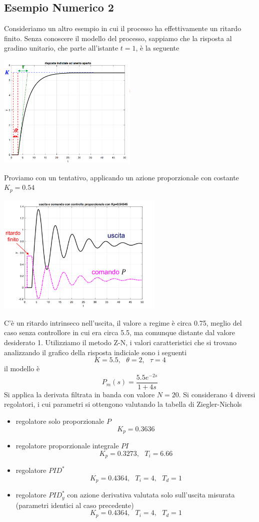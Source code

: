 \documentclass[10pt, letterpaper]{report}
\begin{document}
\subsection{Esempio Numerico 2}
Consideriamo un altro esempio in cui il processo ha effettivamente un ritardo finito. Senza conoscere il modello del processo, sappiamo che la risposta al gradino unitario, che parte all'istante $t=1$, è la seguente 
\begin{center}
    \includegraphics[width=0.5\textwidth]{images/ZN8.png}
\end{center}
Proviamo con un tentativo, applicando un azione proporzionale con costante $K_p=0.54$
\begin{center}
    \includegraphics[width=0.6\textwidth]{images/ZN9.png}
\end{center}
C'è un ritardo intrinseco nell'uscita, il valore a regime è circa 0.75, meglio del caso senza controllore in cui era circa 5.5, ma comunque distante dal valore desiderato 1. Utilizziamo il metodo Z-N, i valori caratteristici che si trovano analizzando il grafico della risposta indiciale sono i seguenti
$$ K=5.5, \ \  \
\theta = 2, \ \  \
\tau = 4 $$
il modello è 
$$ P_m(s)=\frac{5.5e^{-2s}}{1+4s}$$
Si applica la derivata filtrata in banda con valore $N=20$.
Si considerano 4 diversi regolatori, i cui parametri si ottengono valutando la tabella di Ziegler-Nichols
\begin{itemize}
    \item regolatore solo proporzionale $P$ $$ K_p=0.3636$$
    \item regolatore proporzionale integrale $PI$ $$  K_p=0.3273, \ \ \ T_i=6.66$$
    \item regolatore $PID^*$ $$ K_p=0.4364, \ \ \
    T_i=4 , \ \ \
    T_d=1 $$ 
    \item regolatore $PID^*_y$ con azione derivativa valutata solo sull'uscita misurata (parametri identici al caso precedente)$$ K_p=0.4364, \ \ \
    T_i=4 , \ \ \
    T_d=1 $$ 
\end{itemize}
\end{document}
